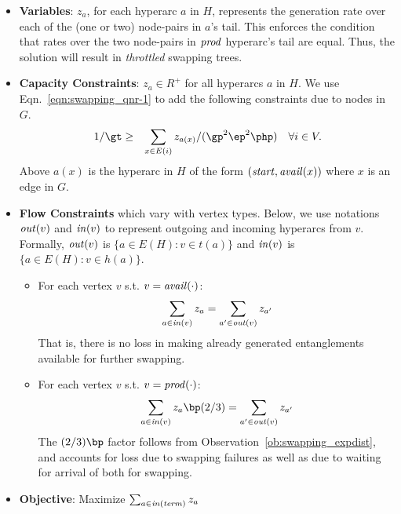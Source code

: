 \begin{itemize}
\item \textbf{Variables}: $z_a$,  for each
  hyperarc $a$ in $H$, represents the \eps generation rate
  over each of the (one or two) node-pairs in $a$'s tail.
  This enforces the condition that \eps rates over the two 
  node-pairs in $\mathit{prod}$ hyperarc's tail are equal. Thus, the \LP 
  solution will result in \emph{throttled} swapping trees.
  
\item \textbf{Capacity Constraints}: $z_a \in R^+$ for all hyperarcs $a$ in $H$. 
We use 
Eqn.~\eqref{eqn:swapping_qnr-1}
to add the following constraints due to nodes in $G$. 
\begin{eqnarray*}
1/\gt &\geq& \sum_{x \in E(i)} z_{a(x)}/(\gp^2\ep^2\php) \quad  \forall i \in V.
\end{eqnarray*}
Above $a(x)$ is the hyperarc in $H$ of the form $(\mathit{start}, \mathit{avail}(x))$ 
where $x$ is an edge in $G$. 

\item \textbf{Flow Constraints} which vary with vertex types. Below, we use
notations $\mathit{out}(v)$ and $\mathit{in}(v)$ to represent outgoing and incoming
hyperarcs from $v$. Formally, $\mathit{out}(v)$ is $\{a \in E(H): v
\in t(a)\}$ and $\mathit{in}(v)$ is $\{a \in E(H): v \in h(a)\}$.

  \begin{itemize}
  \item For each vertex $v$ s.t. $v=\mathit{avail}(\cdot)$:
\[
  \sum_{a \in \mathit{in}(v)}  z_a = \sum_{a' \in \mathit{out}(v)} z_{a'}
\]
That is, there is no loss in making already generated entanglements
available for further swapping.

  \item For each vertex $v$ s.t. $v=\mathit{prod}(\cdot)$:
\[
  \sum_{a \in \id{in}(v)}  z_a\bp(2/3) = \sum_{a' \in \id{out}(v)} z_{a'}
\]
The $(2/3)\bp$ factor follows from Observation~\ref{ob:swapping_expdist}, and
accounts for loss due to swapping failures as well as due to waiting for
arrival of both \epss for swapping.
  \end{itemize}
\item \textbf{Objective}: Maximize $\sum_{a \in \mathit{in}(\mathit{term})} z_a$
\end{itemize}

